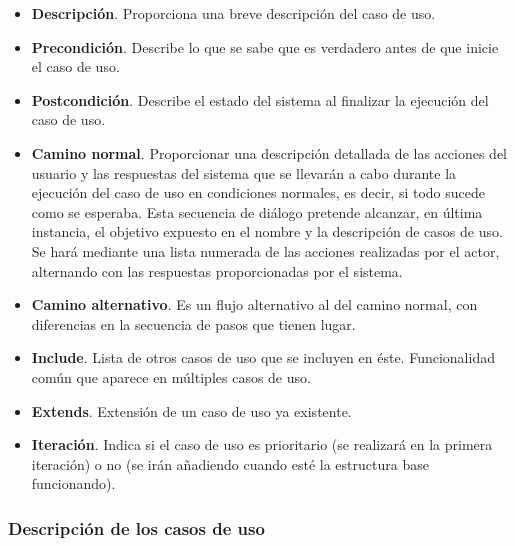 \begin{itemize}
				\item \textbf{Descripción}. Proporciona una breve descripción del caso de uso.
				
				\item \textbf{Precondición}. Describe lo que se sabe que es verdadero antes de que inicie el caso de uso. 
				
				\item \textbf{Postcondición}. Describe el estado del sistema al finalizar la ejecución del caso de uso.
				
				\item \textbf{Camino normal}. Proporcionar una descripción detallada de las acciones del usuario y las respuestas del sistema que se llevarán a cabo durante la ejecución del caso de uso en condiciones normales, es decir, si todo sucede como se esperaba. Esta secuencia de diálogo pretende alcanzar, en última instancia, el objetivo expuesto en el nombre y la descripción de casos de uso. Se hará mediante una lista numerada de las acciones realizadas por el actor, alternando con las respuestas proporcionadas por el sistema.
				
				\item \textbf{Camino alternativo}. Es un flujo alternativo al del camino normal, con diferencias en la secuencia de pasos que tienen lugar. 
				
				\item \textbf{Include}. Lista de otros casos de uso que se incluyen en éste. Funcionalidad común que aparece en múltiples casos de uso.
				
				\item \textbf{Extends}. Extensión de un caso de uso ya existente.
				
				\item \textbf{Iteración}. Indica si el caso de uso es prioritario (se realizará en la primera iteración) o no (se irán añadiendo cuando esté la estructura base funcionando).
		
			\end{itemize}
		
		
		\subsubsection{Descripción de los casos de uso} %
		\label{sub:descripcion_de_los_casos_de_uso}
		
